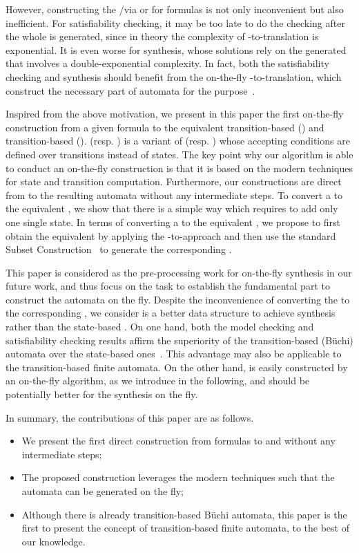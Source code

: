However, constructing the \NFA/\DFA via \spot or \mona for \ltlf formulas is not only inconvenient but also inefficient. For \ltlf satisfiability checking, it may be too late to do the checking after the whole \NFA is generated, since in theory the complexity of \ltlf-to-\NFA translation is exponential. It is even worse for \ltlf synthesis, whose solutions rely on the generated \DFA that involves a double-exponential complexity. In fact, both the \ltlf satisfiability checking and \ltlf synthesis should benefit from the on-the-fly \ltlf-to-\DFA translation, which construct the necessary part of automata for the purpose~\cite{GPVW95}.  

Inspired from the above motivation, we present in this paper the first on-the-fly construction from a given \ltlf formula to the equivalent transition-based \NFA (\TNFA) and transition-based \DFA (\TDFA). \TNFA (resp. \TDFA) is a variant of \NFA (resp. \DFA) whose accepting conditions are defined over transitions instead of states. The key point why our algorithm is able to conduct an on-the-fly construction is that it is based on the modern \SAT techniques for state and transition computation. Furthermore, our constructions are direct from \ltlf to the resulting automata without any intermediate steps. To convert a \TNFA to the equivalent \NFA, we show that there is a simple way which requires to add only one single state. In terms of converting a \TDFA to the equivalent \DFA, we propose to first obtain the equivalent \NFA by applying the \TNFA-to-\NFA approach and then use the standard Subset Construction~\cite{RS59} to generate the corresponding \DFA.   

This paper is considered as the pre-processing work for \ltlf on-the-fly synthesis in our future work, and thus focus on the task to establish the fundamental part to construct the automata on the fly. Despite the inconvenience of converting the \TDFA to the corresponding \DFA, we consider \TDFA is a better data structure to achieve \ltlf synthesis rather than the state-based \DFA. On one hand, both the \ltl model checking and \ltl satisfiability checking results affirm the superiority of the transition-based (B\"uchi) automata over the state-based ones~\cite{GL02}. This advantage may also be applicable to the transition-based finite automata. On the other hand, \TDFA is easily constructed by an on-the-fly algorithm, as we introduce in the following, and should be potentially better for the synthesis on the fly. 

In summary, the contributions of this paper are as follows.
\begin{itemize}
	\item We present the first direct construction from \ltlf formulas to \TNFA and \TDFA without any intermediate steps;
	\item The proposed construction leverages the modern \SAT techniques such that the automata can be generated on the fly;
	\item Although there is already transition-based B\"uchi automata, this paper is the first to present the concept of transition-based finite automata, to the best of our knowledge.
\end{itemize}

